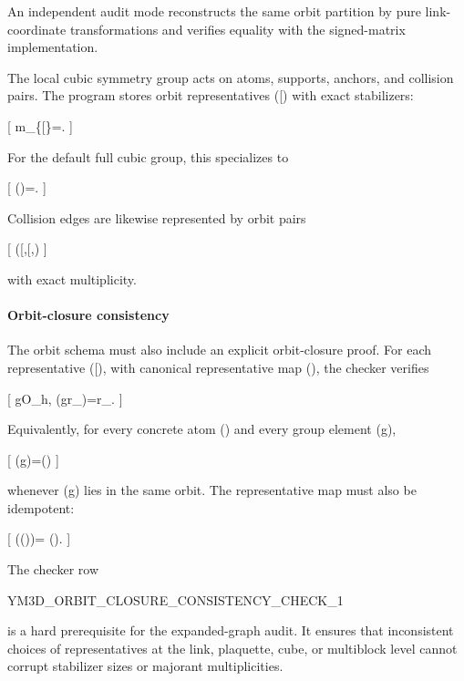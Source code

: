 \documentclass[
]{article}
\newenvironment{Shaded}{}{}
\newcommand{\NormalTok}[1]{#1}
\begin{document}
An independent audit mode reconstructs the same orbit partition by pure
link-coordinate transformations and verifies equality with the
signed-matrix implementation.

The local cubic symmetry group acts on atoms, supports, anchors, and
collision pairs. The program stores orbit representatives ({[}\alpha{]})
with exact stabilizers:

{[}
m\_\{{[}\alpha{]}\}=.
{]}

For the default full cubic group, this specializes to

{[}
\textbar{}(\alpha)\textbar=.
{]}

Collision edges are likewise represented by orbit pairs

{[} ({[}\alpha{]},{[}\beta{]},) {]}

with exact multiplicity.

\paragraph{Orbit-closure consistency}\label{orbit-closure-consistency}

The orbit schema must also include an explicit orbit-closure proof. For
each representative ({[}\alpha{]}), with canonical representative map
(), the checker verifies

{[} \forall g\in O\_h,\qquad
{}(g\cdot r\_\alpha)=r\_\alpha. {]}

Equivalently, for every concrete atom (\alpha) and every group element
(g),

{[} (g\cdot \alpha)=(\alpha) {]}

whenever (g\cdot\alpha) lies in the same orbit. The representative map
must also be idempotent:

{[} ((\alpha))=
(\alpha). {]}

The checker row

\begin{Shaded}
\begin{Highlighting}[]
\NormalTok{YM3D\_ORBIT\_CLOSURE\_CONSISTENCY\_CHECK\_1}
\end{Highlighting}
\end{Shaded}

is a hard prerequisite for the expanded-graph audit. It ensures that
inconsistent choices of representatives at the link, plaquette, cube, or
multiblock level cannot corrupt stabilizer sizes or majorant
multiplicities.
\end{document}
